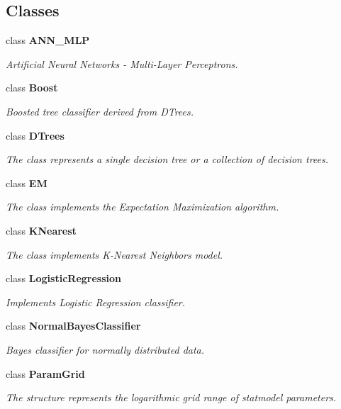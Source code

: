 \subsection*{Classes}
\begin{DoxyCompactItemize}
\item 
class {\bfseries A\+N\+N\+\_\+\+M\+LP}
\begin{DoxyCompactList}\small\item\em Artificial Neural Networks -\/ Multi-\/\+Layer Perceptrons. \end{DoxyCompactList}\item 
class {\bfseries Boost}
\begin{DoxyCompactList}\small\item\em Boosted tree classifier derived from D\+Trees. \end{DoxyCompactList}\item 
class {\bfseries D\+Trees}
\begin{DoxyCompactList}\small\item\em The class represents a single decision tree or a collection of decision trees. \end{DoxyCompactList}\item 
class {\bfseries EM}
\begin{DoxyCompactList}\small\item\em The class implements the Expectation Maximization algorithm. \end{DoxyCompactList}\item 
class {\bfseries K\+Nearest}
\begin{DoxyCompactList}\small\item\em The class implements K-\/\+Nearest Neighbors model. \end{DoxyCompactList}\item 
class {\bfseries Logistic\+Regression}
\begin{DoxyCompactList}\small\item\em Implements Logistic Regression classifier. \end{DoxyCompactList}\item 
class {\bfseries Normal\+Bayes\+Classifier}
\begin{DoxyCompactList}\small\item\em Bayes classifier for normally distributed data. \end{DoxyCompactList}\item 
class {\bfseries Param\+Grid}
\begin{DoxyCompactList}\small\item\em The structure represents the logarithmic grid range of statmodel parameters. \end{DoxyCompactList}\item 

\end{DoxyCompactItemize}
